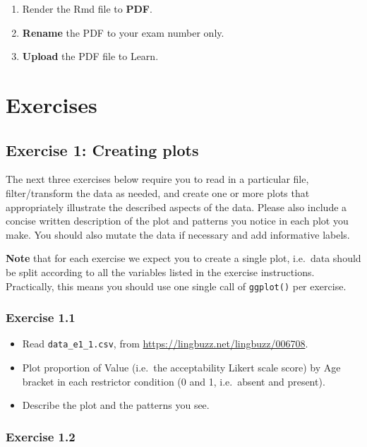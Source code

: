 \documentclass[
]{article}
\providecommand{\tightlist}{%
  \setlength{\itemsep}{0pt}\setlength{\parskip}{0pt}}
\begin{document}
\begin{enumerate}
\def\labelenumi{\arabic{enumi}.}
\tightlist
\item
  Render the Rmd file to \textbf{PDF}.
\item
  \textbf{Rename} the PDF to your exam number only.
\item
  \textbf{Upload} the PDF file to Learn.
\end{enumerate}

\newpage

\section{Exercises}\label{exercises}

\subsection{Exercise 1: Creating plots}\label{exercise-1-creating-plots}

The next three exercises below require you to read in a particular file,
filter/transform the data as needed, and create one or more plots that
appropriately illustrate the described aspects of the data. Please also
include a concise written description of the plot and patterns you
notice in each plot you make. You should also mutate the data if
necessary and add informative labels.

\textbf{Note} that for each exercise we expect you to create a single
plot, i.e.~data should be split according to all the variables listed in
the exercise instructions. Practically, this means you should use one
single call of \texttt{ggplot()} per exercise.

\subsubsection{Exercise 1.1}\label{exercise-1.1}

\begin{itemize}
\tightlist
\item
  Read \texttt{data\_e1\_1.csv}, from
  \url{https://lingbuzz.net/lingbuzz/006708}.
\item
  Plot proportion of Value (i.e.~the acceptability Likert scale score)
  by Age bracket in each restrictor condition (0 and 1, i.e.~absent and
  present).
\item
  Describe the plot and the patterns you see.
\end{itemize}

\subsubsection{Exercise 1.2}\label{exercise-1.2}
\end{document}
